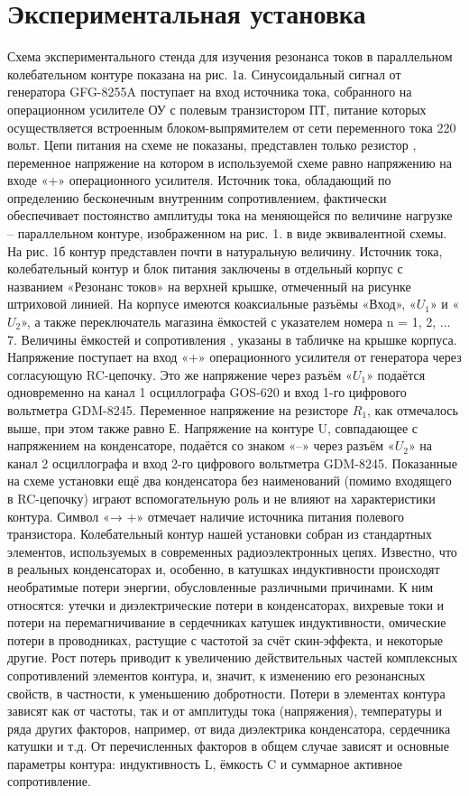 \documentclass[a4paper, 12pt]{article}
\begin{document}
\section{Экспериментальная установка}
\hspace{0.6cm}Схема экспериментального стенда для изучения резонанса токов в параллельном колебательном контуре показана на рис. 1а. Синусоидальный сигнал от генератора GFG-8255A поступает на вход источника тока, собранного на операционном усилителе ОУ с полевым транзистором ПТ, питание которых осуществляется встроенным блоком-выпрямителем от сети переменного
тока 220 вольт. Цепи питания на схеме не показаны, представлен только резистор , переменное напряжение на котором в используемой схеме равно напряжению на входе «+» операционного усилителя. Источник тока, обладающий по определению бесконечным внутренним сопротивлением, фактически обеспечивает постоянство амплитуды тока на меняющейся по величине нагрузке – параллельном контуре, изображенном на рис. 1. в виде эквивалентной схемы. На рис. 1б контур представлен почти в натуральную величину. Источник тока, колебательный контур и блок питания заключены в отдельный корпус с названием «Резонанс токов» на верхней крышке, отмеченный на рисунке штриховой линией. На корпусе имеются коаксиальные разъёмы «Вход», «$U_{1}$» и «$U_{2}$», а также переключатель магазина ёмкостей с указателем номера n = 1, 2, ... 7. Величины ёмкостей и сопротивления
, указаны в табличке на крышке корпуса. Напряжение поступает на вход
«+» операционного усилителя от генератора через согласующую RC-цепочку. Это же напряжение через разъём «$U_{1}$» подаётся одновременно на канал 1 осциллографа GOS-620 и вход 1-го цифрового вольтметра GDM-8245. Переменное напряжение на резисторе $R_{1}$, как отмечалось выше, при этом также равно Е. Напряжение на контуре U, совпадающее с напряжением на конденсаторе, подаётся со знаком «–» через разъём «$U_{2}$» на канал 2 осциллографа и вход 2-го цифрового вольтметра GDM-8245. Показанные на схеме установки ещё два конденсатора без наименований (помимо входящего в RC-цепочку) играют вспомогательную роль и не влияют на характеристики контура. Символ «→ +» отмечает наличие источника питания полевого транзистора. Колебательный контур нашей установки собран из стандартных элементов, используемых в
современных радиоэлектронных цепях. Известно, что в реальных конденсаторах и, особенно, в катушках индуктивности происходят необратимые потери энергии, обусловленные различными причинами. К ним относятся: утечки и диэлектрические потери в конденсаторах, вихревые токи и потери на перемагничивание в сердечниках катушек индуктивности, омические потери в проводниках, растущие с частотой за счёт скин-эффекта, и некоторые другие. Рост потерь приводит к увеличению действительных частей комплексных сопротивлений элементов контура, и, значит, к изменению его резонансных свойств, в частности, к уменьшению добротности. Потери в элементах контура зависят как от частоты, так и от амплитуды тока (напряжения),
температуры и ряда других факторов, например, от вида диэлектрика конденсатора, сердечника катушки и т.д. От перечисленных факторов в общем случае зависят и основные параметры контура: индуктивность L, ёмкость C и суммарное активное сопротивление.
\end{document}
